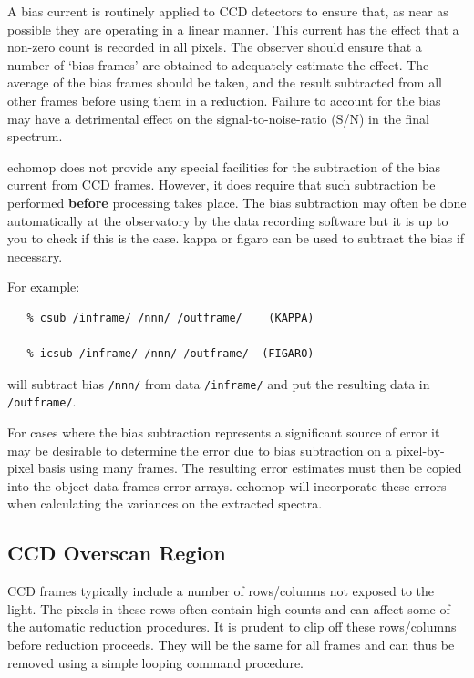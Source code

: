 \documentclass[11pt,twoside]{article}
\newcommand{\xref}[3]{#1}
\newcommand{\xlabel}[1]{}
\newcommand{\mlabel}[1]{\xlabel{#1}\label{#1}}
\newcommand{\myindex}[1]{\index{#1}}
\renewcommand{\myindex}[1]{}
\begin{document}
A bias current is routinely applied to CCD detectors to ensure that, as
near as possible they are operating in a linear manner. This current
has the effect that a non-zero count is recorded in all pixels. The
observer should ensure that a number of `bias frames' are obtained to
adequately estimate the effect. The average of the bias frames should
be taken, and the result subtracted from all other frames before using
them in a reduction.  Failure to account for the bias may have a
detrimental effect on the signal-to-noise-ratio (S/N) in the final
spectrum.

{\sc echomop} does not provide any special facilities for the subtraction
of the bias current from CCD frames.  However, it does require that such
subtraction be performed {\bf before} processing takes place.
The bias subtraction may often be done automatically at the observatory
by the data recording software but it is up to you to check if this
is the case.
\xref{{\sc kappa}}{sun95}{CSUB} or \xref{{\sc figaro}}{sun86}{ICSUB} can be
used to subtract the bias if necessary.

For example:
\myindex{KAPPA!CSUB}
\myindex{FIGARO!ICSUB}
\begin{verbatim}
   % csub /inframe/ /nnn/ /outframe/    (KAPPA)

   % icsub /inframe/ /nnn/ /outframe/  (FIGARO)
\end{verbatim}

will subtract bias {\tt /nnn/} from data {\tt /inframe/} and put the
resulting data in {\tt /outframe/}\@.

For cases where the bias subtraction represents a significant source of
error it may be desirable to determine the error due to bias subtraction
on a pixel-by-pixel basis using many frames.
The resulting error estimates must then be copied into the object data
frames error arrays.
{\sc echomop} will incorporate these errors when calculating the
variances on the extracted spectra.

\subsection{\mlabel{CCD_overscan}CCD Overscan Region}
\myindex{CCD!overscan region}
\myindex{Bad row/column}
CCD frames typically include a number of rows/columns not exposed to the
light. The pixels in these rows often contain high counts and can affect
some of the automatic reduction procedures. It is prudent to clip off
these rows/columns before reduction proceeds. They will be the same for
all frames and can thus be removed using a simple looping command procedure.
\end{document}
